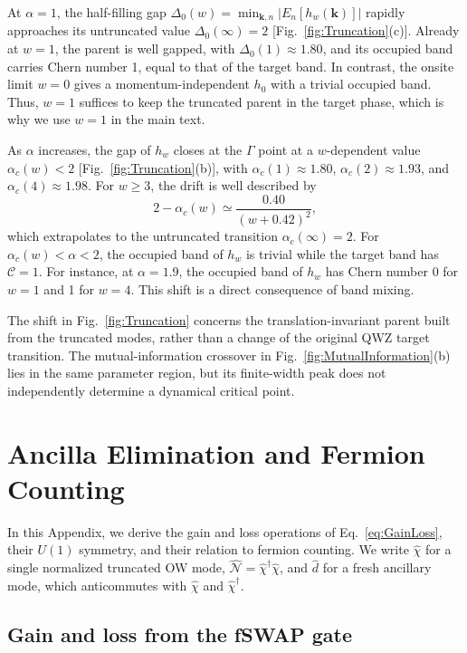 \documentclass[aps,prb,10pt,twocolumn,superscriptaddress,longbibliography,floatfix]{revtex4-2}
\newcommand{\mc}[1]{\mathcal{#1}}
\newcommand{\bk}{\boldsymbol k}
\begin{document}
At $\alpha=1$, the half-filling gap $\Delta_0(w)=\min_{\bk,n}|E_n[h_w(\bk)]|$ rapidly approaches its untruncated value $\Delta_0(\infty)=2$ [Fig.~\ref{fig:Truncation}(c)]. Already at $w=1$, the parent is well gapped, with $\Delta_0(1)\approx1.80$, and its occupied band carries Chern number 1, equal to that of the target band. In contrast, the onsite limit $w=0$ gives a momentum-independent $h_0$ with a trivial occupied band. Thus, $w=1$ suffices to keep the truncated parent in the target phase, which is why we use $w=1$ in the main text.

As $\alpha$ increases, the gap of $h_w$ closes at the $\Gamma$ point at a $w$-dependent value $\alpha_c(w)<2$ [Fig.~\ref{fig:Truncation}(b)], with $\alpha_c(1)\approx1.80$, $\alpha_c(2)\approx1.93$, and $\alpha_c(4)\approx1.98$. For $w\geq3$, the drift is well described by
\begin{equation}
    2-\alpha_c(w)\simeq\frac{0.40}{(w+0.42)^2},
    \label{eq:CriticalDrift}
\end{equation}
which extrapolates to the untruncated transition $\alpha_c(\infty)=2$. For $\alpha_c(w)<\alpha<2$, the occupied band of $h_w$ is trivial while the target band has $\mc C=1$. For instance, at $\alpha=1.9$, the occupied band of $h_w$ has Chern number 0 for $w=1$ and 1 for $w=4$. This shift is a direct consequence of band mixing.

{\color{blue}
The shift in Fig.~\ref{fig:Truncation} concerns the translation-invariant parent built from the truncated modes, rather than a change of the original QWZ target transition. The mutual-information crossover in Fig.~\ref{fig:MutualInformation}(b) lies in the same parameter region, but its finite-width peak does not independently determine a dynamical critical point.
}

\FloatBarrier
\section{Ancilla Elimination and Fermion Counting}
\label{app:FermionCounting}

In this Appendix, we derive the gain and loss operations of Eq.~\eqref{eq:GainLoss}, their $U(1)$ symmetry, and their relation to fermion counting. We write $\hat\chi$ for a single normalized truncated OW mode, $\hat{\mc N}=\hat\chi^\dagger\hat\chi$, and $\hat d$ for a fresh ancillary mode, which anticommutes with $\hat\chi$ and $\hat\chi^\dagger$.

\subsection{Gain and loss from the fSWAP gate}
\end{document}
